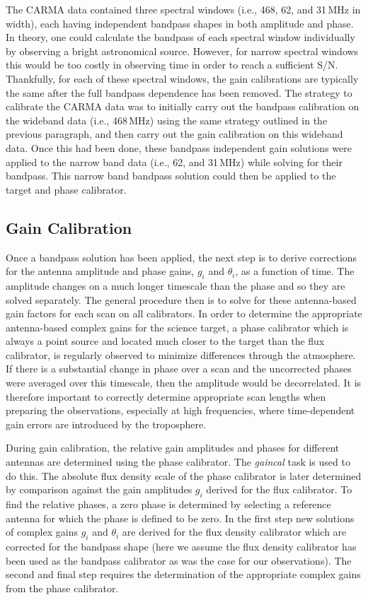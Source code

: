 The CARMA data contained three spectral windows (i.e., 468, 62, and 31\,MHz in width), each having independent bandpass shapes in both amplitude and phase. In theory, one could calculate the bandpass of each spectral window individually by observing a bright astronomical source. However, for narrow spectral windows this would be too costly in observing time in order to reach a sufficient S/N. Thankfully, for each of these spectral windows, the gain calibrations are typically the same  after the full bandpass dependence has been removed. The strategy to calibrate the CARMA data was to initially carry out the bandpass calibration on the wideband data (i.e., 468\,MHz) using the same strategy outlined in the previous paragraph, and then carry out the gain calibration on this wideband data. Once this had been done, these bandpass independent gain solutions were applied to the narrow band data (i.e., 62, and 31\,MHz) while solving for their bandpass. This narrow band bandpass solution could then be applied to the target and phase calibrator.

\subsection{Gain Calibration}

Once a bandpass solution has been applied, the next step is to derive corrections for the antenna amplitude and phase gains, $g_{i}$ and $\theta _{i}$, as a function of time. The amplitude changes on a much longer timescale than the phase and so they are solved separately. The general procedure then is to solve for these antenna-based gain factors for each scan on all calibrators. In order to determine the appropriate antenna-based complex gains for the science target, a phase calibrator which is always a point source and located much closer to the target than the flux calibrator, is regularly observed to minimize differences through the atmosphere. If there is a substantial change in phase over a scan and the uncorrected phases were averaged over this timescale, then the amplitude would be decorrelated. It is therefore important to correctly determine appropriate scan lengths when preparing the observations, especially at high frequencies, where  time-dependent gain errors are introduced by the troposphere.

During gain calibration, the relative gain amplitudes and phases for different antennas are determined using the phase calibrator. The \textit{gaincal} task is used to do this. The absolute flux density scale of the phase calibrator is later determined by comparison against the gain amplitudes $g_{i}$ derived for the flux calibrator. To find the relative phases, a zero phase is determined by selecting a reference antenna for which the phase is defined to be zero. In the first step new solutions of complex gains $g_{i}$ and $\theta _{i}$ are derived for the flux density calibrator which are corrected for the bandpass shape (here we assume the flux density calibrator has been used as the bandpass calibrator as was the case for our observations). The second and final step requires the determination of the appropriate complex gains from the phase calibrator.


